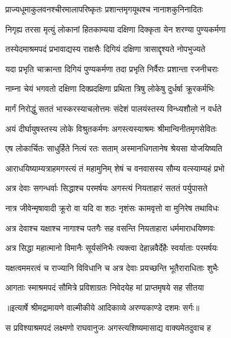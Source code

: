 \twolineshloka
{प्राज्यधूमाकुलवनश्चीरमालापरिष्कृतः}
{प्रशान्तमृगयूथश्च नानाशकुनिनादितः} %

\twolineshloka
{निगृह्य तरसा मृत्युं लोकानां हितकाम्यया}
{दक्षिणा दिक्कृता येन शरण्या पुण्यकर्मणा} %

\twolineshloka
{तस्येदमाश्रमपदं प्रभावाद्यस्य राक्षसैः}
{दिगियं दक्षिणा त्रासाद्दृश्यते नोपभुज्यते} %

\twolineshloka
{यदा प्रभृति चाक्रान्ता दिगियं पुण्यकर्मणा}
{तदा प्रभृति निर्वैराः प्रशान्ता रजनीचराः} %

\twolineshloka
{नाम्ना चेयं भगवतो दक्षिणा दिक्प्रदक्षिणा}
{प्रथिता त्रिषु लोकेषु दुर्धर्षा क्रूरकर्मभिः} %

\twolineshloka
{मार्गं निरोद्धुं सततं भास्करस्याचलोत्तमः}
{संदेशं पालयंस्तस्य विन्ध्यशौलो न वर्धते} %

\twolineshloka
{अयं दीर्घायुषस्तस्य लोके विश्रुतकर्मणः}
{अगस्त्यस्याश्रमः श्रीमान्विनीतमृगसेवितः} %

\twolineshloka
{एष लोकार्चितः साधुर्हिते नित्यं रतः सताम्}
{अस्मानधिगतानेष श्रेयसा योजयिष्यति} %

\twolineshloka
{आराधयिष्याम्यत्राहमगस्त्यं तं महामुनिम्}
{शेषं च वनवासस्य सौम्य वत्स्याम्यहं प्रभो} %

\twolineshloka
{अत्र देवाः सगन्धर्वाः सिद्धाश्च परमर्षयः}
{अगस्त्यं नियताहारं सततं पर्युपासते} %

\twolineshloka
{नात्र जीवेन्मृषावादी क्रूरो वा यदि वा शठः}
{नृशंसः कामवृत्तो वा मुनिरेष तथाविधः} %

\twolineshloka
{अत्र देवाश्च यक्षाश्च नागाश्च पतगैः सह}
{वसन्ति नियताहारा धर्ममाराधयिष्णवः} %

\twolineshloka
{अत्र सिद्धा महात्मानो विमानैः सूर्यसंनिभैः}
{त्यक्त्वा देहान्नवैर्देहैः स्वर्याताः परमर्षयः} %

\twolineshloka
{यक्षत्वममरत्वं च राज्यानि विविधानि च}
{अत्र देवाः प्रयच्छन्ति भूतैराराधिताः शुभैः} %

\twolineshloka
{आगताः स्माश्रमपदं सौमित्रे प्रविशाग्रतः}
{निवेदयेह मां प्राप्तमृषये सह सीतया} %


{॥इत्यार्षे श्रीमद्रामायणे वाल्मीकीये आदिकाव्ये अरण्यकाण्डे दशमः सर्गः॥}


\twolineshloka
{स प्रविश्याश्रमपदं लक्ष्मणो राघवानुजः}
{अगस्त्यशिष्यमासाद्य वाक्यमेतदुवाच ह} %

